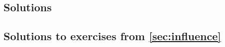 \documentclass[11pt]{article}
\begin{document}
\begin{pdfonly}
\begin{solutionsonly}
\clearpage
\appendix
\section{Solutions}\label{app:solutions}
\end{solutionsonly}
\end{pdfonly}



\begin{pdfonly}\begin{solutionsonly}
\subsection{Solutions to exercises from \cref{sec:influence}}
\end{solutionsonly}\end{pdfonly}
\end{document}
